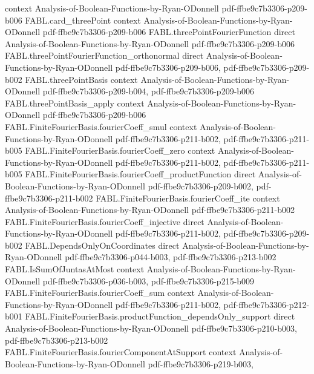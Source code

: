 \begin{theorem}
  {context}
  {Analysis-of-Boolean-Functions-by-Ryan-ODonnell}
  {pdf-ffbe9c7b3306-p209-b006}
\proofstep
  {FABL.card_threePoint}
  {context}
  {Analysis-of-Boolean-Functions-by-Ryan-ODonnell}
  {pdf-ffbe9c7b3306-p209-b006}
\proofstep
  {FABL.threePointFourierFunction}
  {direct}
  {Analysis-of-Boolean-Functions-by-Ryan-ODonnell}
  {pdf-ffbe9c7b3306-p209-b006}
\proofstep
  {FABL.threePointFourierFunction_orthonormal}
  {direct}
  {Analysis-of-Boolean-Functions-by-Ryan-ODonnell}
  {pdf-ffbe9c7b3306-p209-b006,
    pdf-ffbe9c7b3306-p209-b002}
\proofstep
  {FABL.threePointBasis}
  {context}
  {Analysis-of-Boolean-Functions-by-Ryan-ODonnell}
  {pdf-ffbe9c7b3306-p209-b004,
    pdf-ffbe9c7b3306-p209-b006}
\proofstep
  {FABL.threePointBasis_apply}
  {context}
  {Analysis-of-Boolean-Functions-by-Ryan-ODonnell}
  {pdf-ffbe9c7b3306-p209-b006}
\proofstep
  {FABL.FiniteFourierBasis.fourierCoeff_smul}
  {context}
  {Analysis-of-Boolean-Functions-by-Ryan-ODonnell}
  {pdf-ffbe9c7b3306-p211-b002,
    pdf-ffbe9c7b3306-p211-b005}
\proofstep
  {FABL.FiniteFourierBasis.fourierCoeff_zero}
  {context}
  {Analysis-of-Boolean-Functions-by-Ryan-ODonnell}
  {pdf-ffbe9c7b3306-p211-b002,
    pdf-ffbe9c7b3306-p211-b005}
\proofstep
  {FABL.FiniteFourierBasis.fourierCoeff_productFunction}
  {direct}
  {Analysis-of-Boolean-Functions-by-Ryan-ODonnell}
  {pdf-ffbe9c7b3306-p209-b002,
    pdf-ffbe9c7b3306-p211-b002}
\proofstep
  {FABL.FiniteFourierBasis.fourierCoeff_ite}
  {context}
  {Analysis-of-Boolean-Functions-by-Ryan-ODonnell}
  {pdf-ffbe9c7b3306-p211-b002}
\proofstep
  {FABL.FiniteFourierBasis.fourierCoeff_injective}
  {direct}
  {Analysis-of-Boolean-Functions-by-Ryan-ODonnell}
  {pdf-ffbe9c7b3306-p211-b002,
    pdf-ffbe9c7b3306-p209-b002}
\proofstep
  {FABL.DependsOnlyOnCoordinates}
  {direct}
  {Analysis-of-Boolean-Functions-by-Ryan-ODonnell}
  {pdf-ffbe9c7b3306-p044-b003,
    pdf-ffbe9c7b3306-p213-b002}
\proofstep
  {FABL.IsSumOfJuntasAtMost}
  {context}
  {Analysis-of-Boolean-Functions-by-Ryan-ODonnell}
  {pdf-ffbe9c7b3306-p036-b003,
    pdf-ffbe9c7b3306-p215-b009}
\proofstep
  {FABL.FiniteFourierBasis.fourierCoeff_sum}
  {context}
  {Analysis-of-Boolean-Functions-by-Ryan-ODonnell}
  {pdf-ffbe9c7b3306-p211-b002,
    pdf-ffbe9c7b3306-p212-b001}
\proofstep
  {FABL.FiniteFourierBasis.productFunction_dependsOnly_support}
  {direct}
  {Analysis-of-Boolean-Functions-by-Ryan-ODonnell}
  {pdf-ffbe9c7b3306-p210-b003,
    pdf-ffbe9c7b3306-p213-b002}
\proofstep
  {FABL.FiniteFourierBasis.fourierComponentAtSupport}
  {context}
  {Analysis-of-Boolean-Functions-by-Ryan-ODonnell}
  {pdf-ffbe9c7b3306-p219-b003,
}
\end{theorem}
